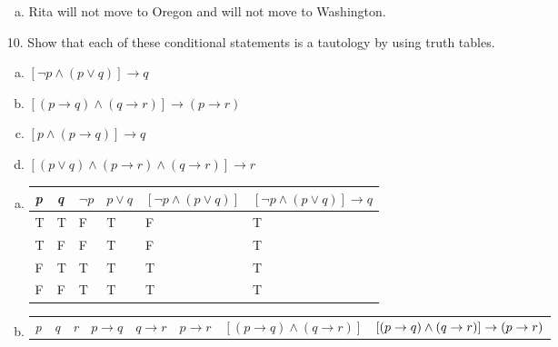 \begin{itemize}
\begin{enumerate}[a.]
              \item Rita will not move to Oregon and will not move to Washington.
          \end{enumerate}
    \item[10.]Show that each of these conditional statements is a tautology by using truth tables.
          \begin{enumerate}[a.]
              \item $[\neg p \land (p \lor q)] \to q$
              \item $[(p \to q) \land (q \to r)] \to (p \to r)$
              \item $[p \land (p \to q)] \to q$
              \item $[(p \lor q) \land (p \to r) \land (q \to r)] \to r$
          \end{enumerate}
          \answer
          \begin{enumerate}[a.]
              \item
                    \begin{tabular}{|l|l|l|l|l|l|}
                        \hline
                        \textit{p} & \textit{q} & $\neg p$ & $p \lor q$ & $[\neg p \land (p \lor q)]$ & $[\neg p \land (p \lor q)] \to q$ \\
                        \hline
                        T          & T          & F        & T          & F                           & T                                 \\
                        \hline
                        T          & F          & F        & T          & F                           & T                                 \\
                        \hline
                        F          & T          & T        & T          & T                           & T                                 \\
                        \hline
                        F          & F          & T        & T          & T                           & T                                 \\
                        \hline
                    \end{tabular}
              \item
                    \begin{tabular}{|l|l|l|l|l|l|l|p{3cm}|}
                        \hline
                        \textit{p} & \textit{q} & \textit{r} & $p \to q$ & $q \to r$ & $p \to r$ & $[(p \to q) \land (q \to r)]$ & $[(p \to q) \land (q \to r)] \newline \to (p \to r)$ \\

\end{tabular}
\end{enumerate}
\end{itemize}
